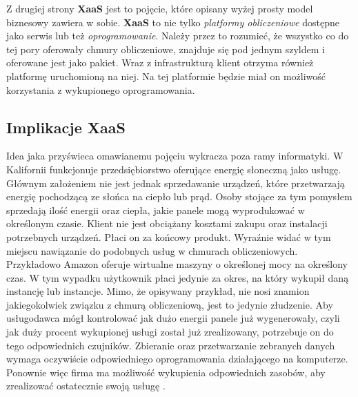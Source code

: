 Z drugiej strony \textbf{XaaS} jest to pojęcie, które
opisany wyżej prosty model biznesowy zawiera w sobie. \textbf{XaaS} to nie tylko \textit{platformy obliczeniowe} dostępne jako serwis lub też \textit{oprogramowanie}.
Należy przez to rozumieć, że wszystko co do tej pory oferowały chmury obliczeniowe, znajduje się pod jednym szyldem i oferowane jest jako pakiet. 
Wraz z infrastrukturą klient otrzyma również platformę uruchomioną na niej. Na tej platformie będzie miał on możliwość korzystania z wykupionego oprogramowania.

\subsection{Implikacje XaaS}
Idea jaka przyświeca omawianemu pojęciu wykracza poza ramy informatyki. W Kalifornii funkcjonuje
przedsiębiorstwo oferujące energię słoneczną jako usługę. Głównym założeniem nie jest jednak sprzedawanie
urządzeń, które przetwarzają energię pochodzącą ze słońca na ciepło lub prąd. Osoby stojące za tym pomysłem sprzedają ilość energii oraz ciepła, jakie 
panele mogą wyprodukować w określonym czasie. Klient nie jest obciążany kosztami zakupu oraz instalacji
potrzebnych urządzeń. Płaci on za końcowy produkt. Wyraźnie widać w tym miejscu nawiązanie do 
podobnych usług w chmurach obliczeniowych. Przykładowo Amazon oferuje wirtualne maszyny o określonej mocy na określony czas. W tym wypadku
użytkownik płaci jedynie za okres, na który wykupił daną instancję lub instancje. Mimo, że opisywany przykład,
nie nosi znamion jakiegokolwiek związku z chmurą obliczeniową, jest to jedynie złudzenie. Aby usługodawca mógł kontrolować jak dużo energii panele
już wygenerowały, czyli jak duży procent wykupionej usługi został już zrealizowany, potrzebuje on do tego odpowiednich czujników. Zbieranie oraz
przetwarzanie zebranych danych wymaga oczywiście odpowiedniego oprogramowania działającego na komputerze. Ponownie więc firma ma możliwość
wykupienia odpowiednich zasobów, aby zrealizować ostatecznie swoją usługę \cite{linkedin_anything_as_a_service}. 